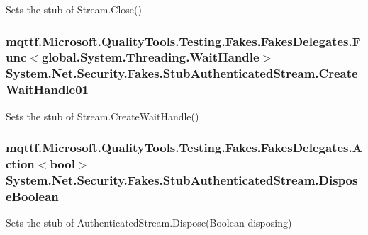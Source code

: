 Sets the stub of Stream.\-Close()

\hypertarget{class_system_1_1_net_1_1_security_1_1_fakes_1_1_stub_authenticated_stream_a3fc27e07b698fe6fcddc75bbc655464c}{
\subsubsection[{Create\-Wait\-Handle01}]{\setlength{\rightskip}{0pt plus 5cm}mqttf.\-Microsoft.\-Quality\-Tools.\-Testing.\-Fakes.\-Fakes\-Delegates.\-Func$<$global.\-System.\-Threading.\-Wait\-Handle$>$ System.\-Net.\-Security.\-Fakes.\-Stub\-Authenticated\-Stream.\-Create\-Wait\-Handle01}}\label{class_system_1_1_net_1_1_security_1_1_fakes_1_1_stub_authenticated_stream_a3fc27e07b698fe6fcddc75bbc655464c}


Sets the stub of Stream.\-Create\-Wait\-Handle()

\hypertarget{class_system_1_1_net_1_1_security_1_1_fakes_1_1_stub_authenticated_stream_af0bbd31ecc9fc055224381879c8bfe94}{
\subsubsection[{Dispose\-Boolean}]{\setlength{\rightskip}{0pt plus 5cm}mqttf.\-Microsoft.\-Quality\-Tools.\-Testing.\-Fakes.\-Fakes\-Delegates.\-Action$<$bool$>$ System.\-Net.\-Security.\-Fakes.\-Stub\-Authenticated\-Stream.\-Dispose\-Boolean}}\label{class_system_1_1_net_1_1_security_1_1_fakes_1_1_stub_authenticated_stream_af0bbd31ecc9fc055224381879c8bfe94}


Sets the stub of Authenticated\-Stream.\-Dispose(\-Boolean disposing)


